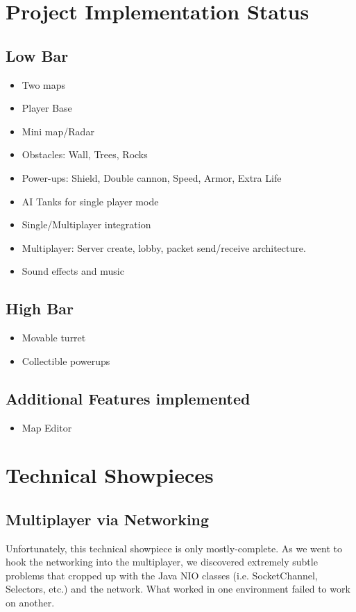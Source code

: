 \documentclass[letterpaper,11pt,twoside]{article}
\begin{document}
\section{Project Implementation Status}

\subsection{Low Bar}
\begin{itemize}
	\item Two maps
	\item Player Base
	\item Mini map/Radar
	\item Obstacles: Wall, Trees, Rocks
	\item Power-ups: Shield, Double cannon, Speed, Armor, Extra Life
	\item AI Tanks for single player mode
	\item Single/Multiplayer integration
	\item Multiplayer: Server create, lobby, packet send/receive architecture.
	\item Sound effects and music
\end{itemize}
\subsection{High Bar}
\begin{itemize}
	\item Movable turret
	\item Collectible powerups
\end{itemize}
\subsection{Additional Features implemented}
\begin{itemize}
	\item Map Editor
\end{itemize}
\section{Technical Showpieces}
\subsection{Multiplayer via Networking}

Unfortunately, this technical showpiece is only mostly-complete. As we went to hook the networking into the multiplayer, we discovered extremely subtle problems that cropped up with the Java NIO classes (i.e. SocketChannel, Selectors, etc.) and the network. What worked in one environment failed to work on another.
\end{document}
